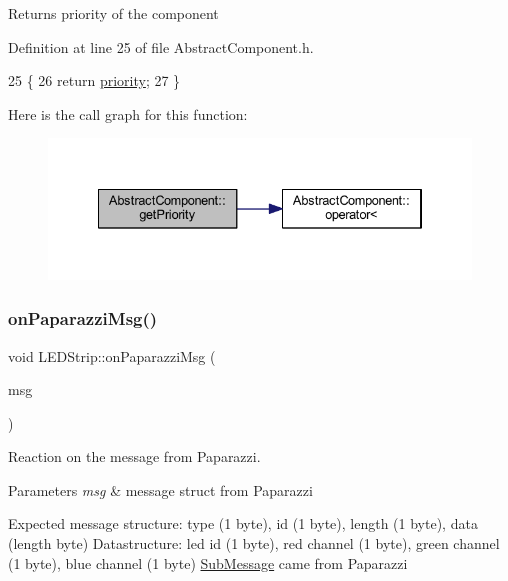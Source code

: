 \begin{DoxyReturn}{Returns}
priority of the component 
\end{DoxyReturn}


Definition at line 25 of file Abstract\+Component.\+h.


\begin{DoxyCode}
25                       \{
26         \textcolor{keywordflow}{return} \hyperlink{class_abstract_component_aff57dfa5f31be093a06b55560e33fb95}{priority};
27     \}
\end{DoxyCode}
Here is the call graph for this function\+:
\nopagebreak
\begin{figure}[H]
\begin{center}
\leavevmode
\includegraphics[width=334pt]{class_abstract_component_ac0b440d1d642ff1292ec3c544d75a8f1_cgraph}
\end{center}
\end{figure}
\mbox{\label{class_l_e_d_strip_af9708cc14c0e3f75e5b3c268b398f436}} 
\subsubsection{\texorpdfstring{on\+Paparazzi\+Msg()}{onPaparazziMsg()}}
{\footnotesize\ttfamily void L\+E\+D\+Strip\+::on\+Paparazzi\+Msg (\begin{DoxyParamCaption}\item[{\hyperlink{struct_sub_message}{Sub\+Message} $\ast$}]{msg }\end{DoxyParamCaption})\hspace{0.3cm}{\ttfamily [virtual]}}



Reaction on the message from Paparazzi. 


\begin{DoxyParams}{Parameters}
{\em msg} & message struct from Paparazzi\\
\hline
\end{DoxyParams}
Expected message structure\+: type (1 byte), id (1 byte), length (1 byte), data (length byte) Datastructure\+: led id (1 byte), red channel (1 byte), green channel (1 byte), blue channel (1 byte) \hyperlink{struct_sub_message}{Sub\+Message} came from Paparazzi 


